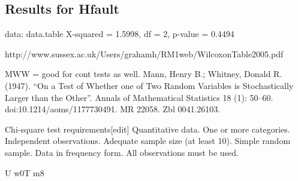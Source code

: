 \documentclass[10pt,twocolumn]{article}
\begin{document}
\subsection{Results for Hfault}

data:  data.table
X-squared = 1.5998, df = 2, p-value = 0.4494

http://www.sussex.ac.uk/Users/grahamh/RM1web/WilcoxonTable2005.pdf



MWW = good for cont tests as well.
 Mann, Henry B.; Whitney, Donald R. (1947). ``On a Test of Whether one of Two Random Variables is Stochastically Larger than the Other''. Annals of Mathematical Statistics 18 (1): 50–60. doi:10.1214/aoms/1177730491. MR 22058. Zbl 0041.26103.












Chi-square test requirements[edit]
Quantitative data.
One or more categories.
Independent observations.
Adequate sample size (at least 10).
Simple random sample.
Data in frequency form.
All observations must be used.




U w0T m8
\end{document}
